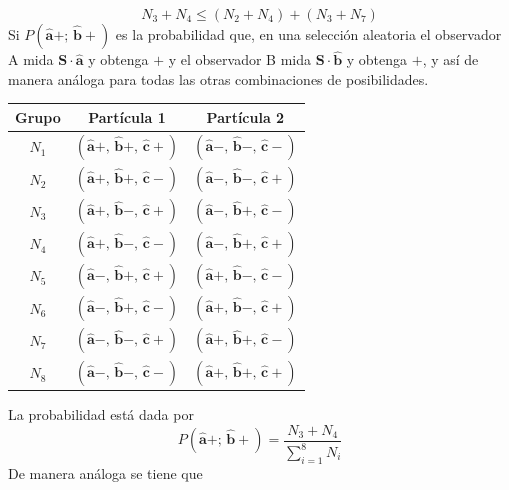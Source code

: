 \documentclass[a4paper]{article}
\begin{document}
\begin{equation}\label{eq::positivity_condition}
N_3 + N_4 \leq (N_2 +  N_4) + (N_3 +  N_7)
\end{equation} 
Si $P(\mathbf{\hat{a}}+;\,\mathbf{\hat{b}}+)$ es la probabilidad que, en una selección aleatoria el observador A mida $\mathbf{S}\cdot \mathbf{\hat{a}}$ y obtenga $+$ y el observador B mida $\mathbf{S}\cdot \mathbf{\hat{b}}$ y obtenga $+$, y así de manera análoga para todas las otras combinaciones de posibilidades.	
\begin{table}
\centering
\begin{tabular}{|c|c|c|}
\hline
\toprule
\textbf{Grupo} & \textbf{Partícula 1} & \textbf{Partícula 2} \\
\midrule
$N_1$ & $(\mathbf{\hat{a}}+,\, \mathbf{\hat{b}}+,\,\mathbf{\hat{c}}+)$ & $(\mathbf{\hat{a}}-,\, \mathbf{\hat{b}}-,\,\mathbf{\hat{c}}-)$\\
$N_2$ & $(\mathbf{\hat{a}}+,\, \mathbf{\hat{b}}+,\,\mathbf{\hat{c}}-)$ & $(\mathbf{\hat{a}}-,\, \mathbf{\hat{b}}-,\,\mathbf{\hat{c}}+)$\\
$N_3$ & $(\mathbf{\hat{a}}+,\, \mathbf{\hat{b}}-,\,\mathbf{\hat{c}}+)$ & $(\mathbf{\hat{a}}-,\, \mathbf{\hat{b}}+,\,\mathbf{\hat{c}}-)$\\
$N_4$ & $(\mathbf{\hat{a}}+,\, \mathbf{\hat{b}}-,\,\mathbf{\hat{c}}-)$ & $(\mathbf{\hat{a}}-,\, \mathbf{\hat{b}}+,\,\mathbf{\hat{c}}+)$\\
$N_5$ & $(\mathbf{\hat{a}}-,\, \mathbf{\hat{b}}+,\,\mathbf{\hat{c}}+)$ & $(\mathbf{\hat{a}}+,\, \mathbf{\hat{b}}-,\,\mathbf{\hat{c}}-)$\\
$N_6$ & $(\mathbf{\hat{a}}-,\, \mathbf{\hat{b}}+,\,\mathbf{\hat{c}}-)$ & $(\mathbf{\hat{a}}+,\, \mathbf{\hat{b}}-,\,\mathbf{\hat{c}}+)$\\
$N_7$ & $(\mathbf{\hat{a}}-,\, \mathbf{\hat{b}}-,\,\mathbf{\hat{c}}+)$ & $(\mathbf{\hat{a}}+,\, \mathbf{\hat{b}}+,\,\mathbf{\hat{c}}-)$\\
$N_8$ & $(\mathbf{\hat{a}}-,\, \mathbf{\hat{b}}-,\,\mathbf{\hat{c}}-)$ & $(\mathbf{\hat{a}}+,\, \mathbf{\hat{b}}+,\,\mathbf{\hat{c}}+)$\\
\bottomrule
\hline
\end{tabular}
    \label{tab:three_direction_correlations}
\end{table}
La probabilidad está dada por 
\begin{equation}
P(\mathbf{\hat{a}}+;\, \mathbf{\hat{b}} +) = \frac{N_3+N_4}{\sum_{i=1}^{8} N_i} 
\end{equation}
De manera análoga se tiene que 
\end{document}
